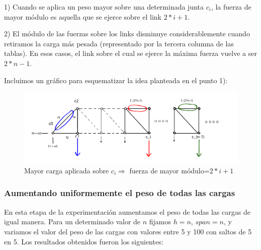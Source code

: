 1) Cuando se aplica un peso mayor sobre una determinada junta $c_{i}$, la fuerza de mayor módulo es aquella que se
ejerce sobre el link $2*i+1$.

2) El módulo de las fuerzas sobre los links disminuye considerablemente cuando retiramos la carga más pesada (representado
por la tercera columna de las tablas). En esos casos, el link sobre el cual se ejerce la máxima fuerza vuelve a ser
$2*n-1$.

Incluimos un gráfico para esquematizar la idea planteada en el punto 1):

\begin{figure}[!h]
	\begin{center}
		  \includegraphics[keepaspectratio]{Imagenes/im_11.pdf}
		  \caption{Mayor carga aplicada sobre $c_{i} \Rightarrow$ fuerza de mayor módulo=$2*i+1$}
		  \label{fig:contra1}
	\end{center}
\end{figure}
\FloatBarrier

\subsubsection{Aumentando uniformemente el peso de todas las cargas}

En esta etapa de la experimentación aumentamos el peso de todas las cargas de igual manera. Para un determinado valor de $n$
fijamos $h=n$, $span=n$, y variamos el valor del peso de las cargas con valores entre 5 y 100 con saltos de 5 en 5. Los
resultados obtenidos fueron los siguientes:

